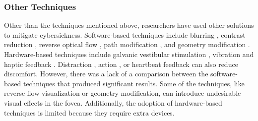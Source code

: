 \subsubsection{Other Techniques}
Other than the techniques mentioned above, researchers have used other solutions to mitigate cybersickness.
Software-based techniques include blurring \cite{lin_how_2020, nie_analysis_2020}, contrast reduction \cite{zhao_mitigation_2022}, reverse optical flow \cite{park_mixing_2022, buhler_reducing_2018, xiao_augmenting_2016}, path modification \cite{hu_reducing_2019}, and geometry modification \cite{groth_cybersickness_2024, nie_like_2023, lou_geometric_2022}.
Hardware-based techniques include galvanic vestibular stimulation \cite{groth_omnidirectional_2022, sra_adding_2019}, vibration \cite{peng_walkingvibe_2020, jung_floor-vibration_2021} and haptic feedback \cite{liu_phantomlegs_2019}.
Distraction \cite{venkatakrishnan_effects_2023, venkatakrishnan_effects_2024}, action \cite{lin_intentional_2022}, or heartbeat feedback \cite{joo_effects_2024} can also reduce discomfort.
However, there was a lack of a comparison between the software-based techniques that produced significant results.
Some of the techniques, like reverse flow visualization or geometry modification, can introduce undesirable visual effects in the fovea.
Additionally, the adoption of hardware-based techniques is limited because they require extra devices.



